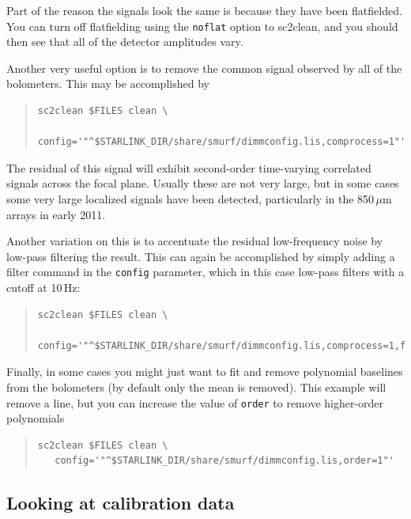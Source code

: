 \documentclass[twoside,11pt]{article}
\newcommand{\xref}[3]{#1}
\renewcommand{\_}{\texttt{\symbol{95}}}
\newenvironment{myquote}{\begin{quote}\begin{small}}{\end{small}\end{quote}}
\newcommand{\task}[1]{\textsf{#1}}
\newcommand{\clean}{\xref{\task{sc2clean}}{sun258}{SC2CLEAN}}
\begin{document}
Part of the reason the signals look the same is because they have been
flatfielded. You can turn off flatfielding using the \texttt{noflat}
option to \clean, and you should then see that all of the detector
amplitudes vary.

Another very useful option is to remove the common signal observed by
all of the bolometers. This may be accomplished by

\begin{myquote}
\begin{verbatim}
sc2clean $FILES clean \
   config='"^$STARLINK_DIR/share/smurf/dimmconfig.lis,comprocess=1"'
\end{verbatim}
\end{myquote}

The residual of this signal will exhibit second-order time-varying
correlated signals across the focal plane. Usually these are not very
large, but in some cases some very large localized signals have been
detected, particularly in the 850\,$\mu$m arrays in early 2011.

Another variation on this is to accentuate the residual low-frequency
noise by low-pass filtering the result. This can again be accomplished
by simply adding a filter command in the \texttt{config} parameter,
which in this case low-pass filters with a cutoff at 10\,Hz:

\begin{myquote}
\begin{verbatim}
sc2clean $FILES clean \
   config='"^$STARLINK_DIR/share/smurf/dimmconfig.lis,comprocess=1,filt_edge_low=10"'
\end{verbatim}
\end{myquote}

Finally, in some cases you might just want to fit and remove
polynomial baselines from the bolometers (by default only the mean is
removed). This example will remove a line, but you can increase the
value of \texttt{order} to remove higher-order polynomials

\begin{myquote}
\begin{verbatim}
sc2clean $FILES clean \
   config='"^$STARLINK_DIR/share/smurf/dimmconfig.lis,order=1"'
\end{verbatim}
\end{myquote}

\subsection{\label{caldata}Looking at calibration data}
\end{document}
